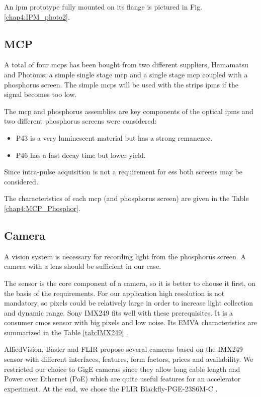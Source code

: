 \begin{refsection}
  An \acrshort{ipm} prototype fully mounted on its flange is pictured in Fig. \ref{chap4:IPM_photo2}.

  

  \subsection{MCP}
  A total of four \acrshort{mcp}s has been bought from two different suppliers, Hamamatsu and Photonis: a simple single stage \acrshort{mcp} and a single stage \acrshort{mcp} coupled with a phosphorus screen. The simple \acrshort{mcp}s will be used with the strips \acrshort{ipm}s if the signal becomes too low.

  The \acrshort{mcp} and phosphorus assemblies are key components of the optical \acrshort{ipm}s and two different phosphorus screens were considered:
  \begin{itemize}
    \item P43 is a very luminescent material but has a strong remanence.
    \item P46 has a fast decay time but lower yield.
  \end{itemize}
  Since intra-pulse acquisition is not a requirement for \acrshort{ess} both screens may be considered.

  The characteristics of each \acrshort{mcp} (and phosphorus screen) are given in the Table \ref{chap4:MCP_Phosphor}.
  

  \subsection{Camera}
  A vision system is necessary for recording light from the phosphorus screen.
  A camera with a lens should be sufficient in our case.

  The sensor is the core component of a camera, so it is better to choose it first, on the basis of the requirements.
  For our application high resolution is not mandatory, so pixels could be relatively large in order to increase light collection and dynamic range.
  Sony IMX249 fits well with these prerequisites. It is a consumer \acrshort{cmos} sensor with big pixels and low noise.
  Its EMVA characteristics are summarized in the Table \ref{tab:IMX249} \cite{emva2010}.
  

  AlliedVision, Basler and FLIR propose several cameras based on the IMX249 sensor with different interfaces, features, form factors, prices and availability.
  We restricted our choice to GigE cameras since they allow long cable length and Power over Ethernet (PoE) which are quite useful features for an accelerator experiment.
  At the end, we chose the FLIR Blackfly-PGE-23S6M-C \cite{blackfly2019}.


\end{refsection}
